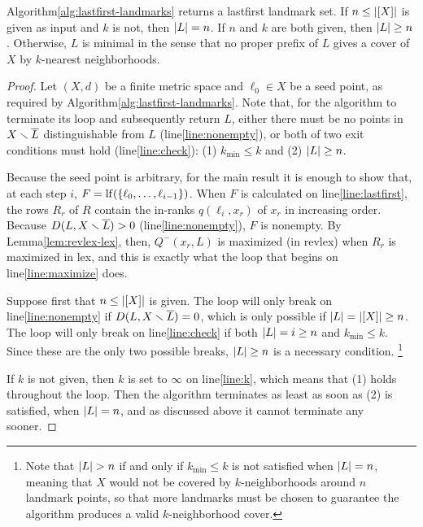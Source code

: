 \documentclass{article}
\begin{document}
\begin{proposition}
Algorithm\nbs\ref{alg:lastfirst-landmarks} returns a lastfirst landmark set.
If $n \leq \lvert [X]\rvert$ is given as input and $k$ is not, then $\lvert L\rvert = n$.
If $n$ and $k$ are both given, then $\lvert L\rvert \geq n$.
Otherwise, $L$ is minimal in the sense that no proper prefix of $L$ gives a cover of $X$ by $k$-nearest neighborhoods.
\end{proposition}

\begin{proof}
Let $(X,d)$ be a finite metric space and $\ell_0 \in X$ be a seed point, as required by Algorithm\nbs\ref{alg:lastfirst-landmarks}.
Note that, for the algorithm to terminate its loop and subsequently return $L$, either there must be no points in $X \smallsetminus \overline{L}$ distinguishable from $L$ (line\nbs\ref{line:nonempty}), or both of two exit conditions must hold (line\nbs\ref{line:check}):
  (1) $k_{\min} \leq k$ and
  (2) $\lvert L\rvert \geq n$.

Because the seed point is arbitrary, for the main result it is enough to show that, at each step $i$, $F = \operatorname{lf}(\{ \ell_0, \ldots, \ell_{i-1} \})$.
When $F$ is calculated on line\nbs\ref{line:lastfirst}, the rows $R_r$ of $R$ contain the in-ranks $q(\ell_i, x_r)$ of $x_r$ in increasing order.
Because $D(L, X \smallsetminus \overline{L}) > 0$ (line\nbs\ref{line:nonempty}), $F$ is nonempty.
By Lemma\nbs\ref{lem:revlex-lex}, then, $Q^-(x_r, L)$ is maximized (in revlex) when $R_r$ is maximized in lex, and this is exactly what the loop that begins on line\nbs\ref{line:maximize} does.

Suppose first that $n \leq \lvert [X]\rvert$ is given.
The loop will only break on line\nbs\ref{line:nonempty} if $D(L, X \smallsetminus \overline{L}) = 0$, which is only possible if $\lvert L\rvert = \lvert [X]\rvert \geq n$.
The loop will only break on line\nbs\ref{line:check} if both $\lvert L\rvert = i \geq n$ and $k_{\min} \leq k$.
Since these are the only two possible breaks, $\lvert L\rvert \geq n$ is a necessary condition.
\footnote{Note that $\lvert L\rvert > n$ if and only if $k_{\min} \leq k$ is not satisfied when $\lvert L\rvert = n$, meaning that $X$ would not be covered by $k$-neighborhoods around $n$ landmark points, so that more landmarks must be chosen to guarantee the algorithm produces a valid $k$-neighborhood cover.}

If $k$ is not given, then $k$ is set to $\infty$ on line\nbs\ref{line:k}, which means that (1) holds throughout the loop.
Then the algorithm terminates as least as soon as (2) is satisfied, when $\lvert L\rvert = n$, and as discussed above it cannot terminate any sooner.


\end{proof}
\end{document}
